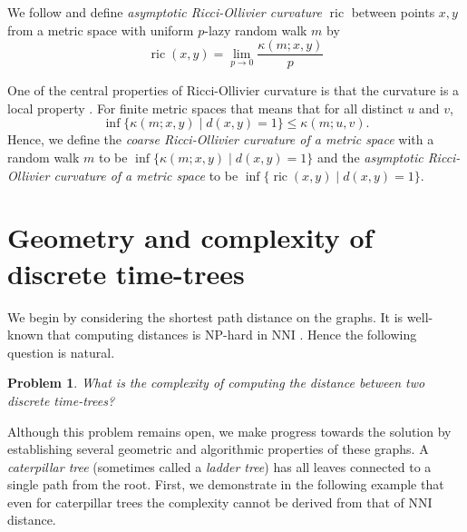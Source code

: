 \documentclass[11pt]{amsart}
\newtheorem{problem}[lemma]{Problem}
\theoremstyle{definition}
\newcommand{\nni}{\mathrm{NNI}}
\newcommand{\ric}{\operatorname{ric}}
\begin{document}
{We follow \textcite{Loisel2014-gu} and define \emph{asymptotic Ricci-Ollivier curvature} $\ric$ between points $x,y$ from a metric space with uniform $p$-lazy random walk $m$ by
\[
\ric(x,y) = \lim_{p\to0} \frac{\kappa(m;x,y)}{p}
\]

One of the central properties of Ricci-Ollivier curvature is that the curvature is a local property \autocite{Ollivier2009-cj}.
For finite metric spaces that means that for all distinct $u$ and $v$,
\[
\inf\{\kappa(m;x,y)\mid d(x,y) = 1\} \leq \kappa(m;u,v).
\]
Hence, we define the \emph{coarse Ricci-Ollivier curvature of a metric space} with a random walk $m$ to be $\inf\{\kappa(m;x,y)\mid d(x,y) = 1\}$ and the \emph{asymptotic Ricci-Ollivier curvature of a metric space} to be $\inf\{\ric(x,y)\mid d(x,y) = 1\}$.
}{}


\section{Geometry and complexity of discrete time-trees}

We begin by considering the shortest path distance on the graphs.
It is well-known that computing distances is NP-hard in $\nni$ \autocite{Dasgupta2000-xa}.
Hence the following question is natural.

\begin{problem}
\label{problemComplexity}
What is the complexity of computing the distance between two discrete time-trees?
\end{problem}

Although this problem remains open, we make progress towards the solution by establishing several geometric and algorithmic properties of these graphs.
A \emph{caterpillar tree} (sometimes called a \emph{ladder tree}) has all leaves connected to a single path from the root.
First, we demonstrate in the following example that even for caterpillar trees the complexity cannot be derived from that of $\nni$ distance.
\end{document}
